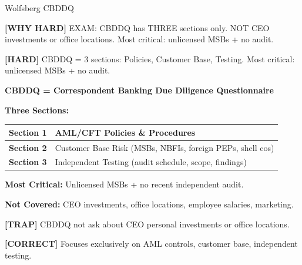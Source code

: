 \documentclass[6pt,aspectratio=169,fontsize=5pt]{beamer}
\renewcommand{\tiny}{\fontsize{3.5pt}{4.5pt}\selectfont}
\renewcommand{\normalsize}{\fontsize{7.5pt}{8.5pt}\selectfont}
\newcommand{\trap}[1]{%
	\begin{block}{\textcolor{redtrap}{\textbf{[TRAP]}}}
		\textcolor{redtrap}{\tiny #1}
	\end{block}
}
\newcommand{\correct}[1]{%
	\begin{block}{\textcolor{greencorrect}{\textbf{[CORRECT]}}}
		\textcolor{greencorrect}{\tiny #1}
	\end{block}
}
\newcommand{\hard}[1]{%
	\begin{block}{\textcolor{hardcolor}{\textbf{[HARD]}}}
		\textcolor{hardcolor}{\tiny #1}
	\end{block}
}
\newcommand{\hardexplain}[1]{%
	\begin{block}{\textcolor{orangehard}{\textbf{[WHY HARD]}}}
		\textcolor{orangehard}{\tiny #1}
	\end{block}
}
\begin{document}
	\begin{frame}{\normalsize Wolfsberg CBDDQ}
		
		\hardexplain{EXAM: CBDDQ has THREE sections only. NOT CEO investments or office locations. Most critical: unlicensed MSBs + no audit.}
		
		\hard{CBDDQ = 3 sections: Policies, Customer Base, Testing. Most critical: unlicensed MSBs + no audit.}
		
		\textbf{CBDDQ = Correspondent Banking Due Diligence Questionnaire}
		
		\textbf{Three Sections:}
		\begin{table}
			\begin{tabular}{|p{2.2cm}|p{5.5cm}|}
				\hline
				\textbf{Section 1} & AML/CFT Policies \& Procedures \\
				\hline
				\textbf{Section 2} & Customer Base Risk (MSBs, NBFIs, foreign PEPs, shell cos) \\
				\hline
				\textbf{Section 3} & Independent Testing (audit schedule, scope, findings) \\
				\hline
			\end{tabular}
		\end{table}
		
		\textbf{Most Critical:} Unlicensed MSBs + no recent independent audit.
		
		\textbf{Not Covered:} CEO investments, office locations, employee salaries, marketing.
		
		\trap{CBDDQ not ask about CEO personal investments or office locations.}
		
		\correct{Focuses exclusively on AML controls, customer base, independent testing.}
	\end{frame}
	
\end{document}
